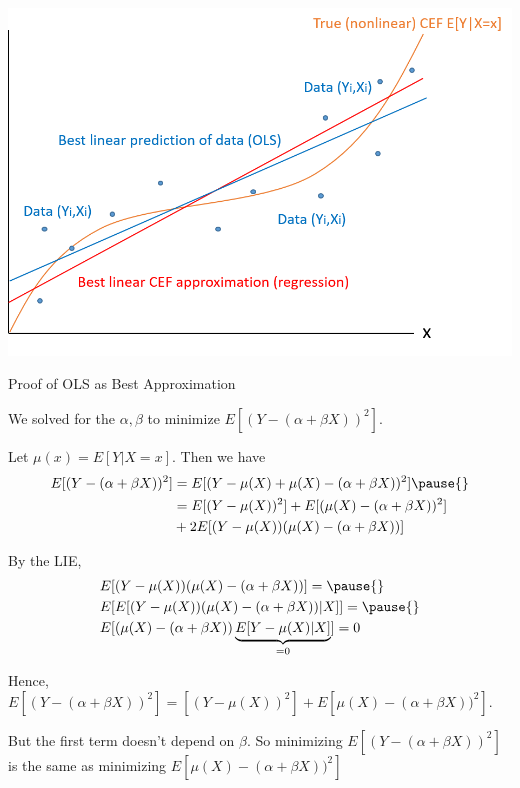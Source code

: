 \documentclass[11pt,english,handout]{beamer}
\newenvironment{wideitemize}{\itemize\addtolength{\itemsep}{10pt}}{\enditemize}
\begin{document}
\begin{frame}
	
	\begin{center}
		\hspace{0.7cm}\includegraphics[scale=0.7]{ols4.png}
	\end{center}
	
\end{frame}





\begin{frame}{Proof of OLS as Best Approximation}
	\begin{wideitemize}
		\item 
		We solved for the $\alpha,\beta$ to minimize $E[  (Y - (\alpha + \beta X))^2 ]$.
		
		\pause
		\item
		Let $\mu(x) = E[Y|X=x]$. Then we have \pause
		\begin{align*}
			E[  (Y - (\alpha + \beta X))^2 ]  &= E[ (Y - \mu(X) + \mu(X) -  (\alpha + \beta X))^2   ] \pause{} \\
			&= E[ (Y - \mu(X) )^2 ] + E[(\mu(X) -  (\alpha + \beta X))^2   ]   \\ &+ 2E[ (Y- \mu(X)) (\mu(X)- (\alpha + \beta X))  ]
		\end{align*}
		
		\pause
		\item
		By the LIE, 
		\begin{align*}
			&E[ (Y- \mu(X)) (\mu(X)-(\alpha + \beta X))  ] = \pause{} \\& E[  E[(Y- \mu(X)) (\mu(X)-(\alpha + \beta X)) |X ]    ] = \pause{}\\
			&E[(\mu(X)-(\alpha + \beta X))  \underbrace{ E[Y- \mu(X) | X] }_{=0}] = 0
		\end{align*} 
		
		\item
		Hence, $E[  (Y - (\alpha + \beta X))^2 ] = [ (Y - \mu(X) )^2 ] + E[\mu(X) -  (\alpha + \beta X))^2   ] .$
		
		\noindent But the first term doesn't depend on $\beta$. So minimizing $E[  (Y - (\alpha + \beta X))^2 ]$ is the same as minimizing $E[\mu(X) -  (\alpha + \beta X))^2   ]$
		
	\end{wideitemize}
\end{frame}
\end{document}
